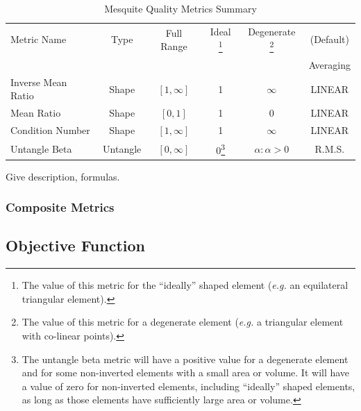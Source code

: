 \begin{table}[h]
\begin{center}
\begin{minipage}[h]{\textwidth}
\renewcommand{\thempfootnote}{\arabic{mpfootnote}}
\begin{tabular}{|l|c|c|c|c|c|}
\hline
Metric Name        & Type       & Full Range  & Ideal \footnote[1]{The value of this metric
for the ``ideally'' shaped element ({\it e.g.} an equilateral triangular element).}
                                                      & Degenerate  \footnote[2]{The value of this metric
for a degenerate element ({\it e.g.} a triangular element with co-linear points).}
                                                                    & (Default) \\
                   &            &             &       &             & Averaging\\
\hline
Inverse Mean Ratio & Shape      &$[1,\infty]$ & 1     & $\infty$    & LINEAR\\ 
Mean Ratio         & Shape      &$[0,1]$      & 1     & 0           & LINEAR\\ 
Condition Number   & Shape      &$[1,\infty]$ & 1     & $\infty$    & LINEAR\\ 
Untangle  Beta     & Untangle   &$[0,\infty]$ & 0\footnote[3]{The untangle beta metric will
have a positive value for a degenerate element and for some non-inverted elements with a small
area or volume.  It will have a value of zero for non-inverted elements, including ``ideally''
shaped elements, as long as those elements have sufficiently large area or volume.}
                                                      & $\alpha : \alpha > 0$ \footnotemark[3]
                                                                    & R.M.S.\\ 
\hline
\end{tabular}
\caption{\label{QualityMetrics1} Mesquite Quality Metrics Summary}
\end{minipage}
\end{center}
\end{table}

 \newline
Give description, formulas. 

\subsubsection{Composite Metrics}

\subsection{Objective Function} \label{sec:ObjectiveFunction}

